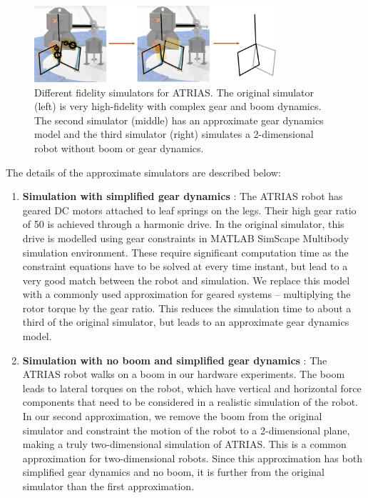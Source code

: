 \begin{figure}
    \centering
    \includegraphics[width = 0.8\textwidth]{img/atrias_gear_boom_simplification.png}
    \caption{Different fidelity simulators for ATRIAS. The original simulator (left) is very high-fidelity with complex gear and boom dynamics. The second simulator (middle) has an approximate gear dynamics model and the third simulator (right) simulates a 2-dimensional robot without boom or gear dynamics.}
    \label{fig:simulators}
\end{figure}

The details of the approximate simulators are described below:

\begin{enumerate}
    \item \textbf{Simulation with simplified gear dynamics} : The ATRIAS robot has geared DC motors attached to leaf springs on the legs. Their high gear ratio of 50 is achieved through a harmonic drive. In the original simulator, this drive is modelled using gear constraints in MATLAB SimScape Multibody simulation environment. These require significant computation time as the constraint equations have to be solved at every time instant, but lead to a very good match between the robot and simulation. We replace this model with a commonly used approximation for geared systems -- multiplying the rotor torque by the gear ratio. This reduces the simulation time to about a third of the original simulator, but leads to an approximate gear dynamics model.

    \item \textbf{Simulation with no boom and simplified gear dynamics} : The ATRIAS robot walks on a boom in our hardware experiments. The boom leads to lateral torques on the robot, which have vertical and horizontal force components that need to be considered in a realistic simulation of the robot. In our second approximation, we remove the boom from the original simulator and constraint the motion of the robot to a 2-dimensional plane, making a truly two-dimensional simulation of ATRIAS. This is a common approximation for two-dimensional robots. Since this approximation has both simplified gear dynamics and no boom, it is further from the original simulator than the first approximation.

\end{enumerate}

